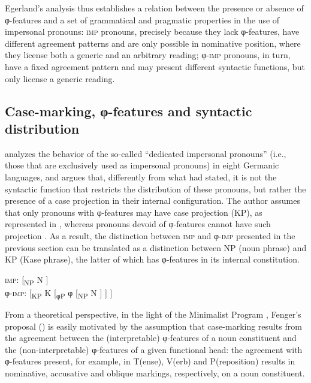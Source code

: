 \documentclass[output=paper]{langscibook}
\begin{document}
{Egerland’s analysis thus establishes a relation between the presence or absence of φ-fea\-tures and a set of grammatical and pragmatic properties in the use of impersonal pronouns: \textsc{imp} pronouns, precisely because they lack φ-fea\-tures, have different agreement patterns and are only possible in nominative position, where they license both a generic and an arbitrary reading; φ-\textsc{imp} pronouns, in turn, have a fixed agreement pattern and may present different syntactic functions, but only license a generic reading.}

\subsection{Case-marking, φ-fea\-tures and syntactic distribution}\label{sec:avelar:3.2}\largerpage[-1]

{\citet{Fenger2018} analyzes the behavior of the so-called “dedicated impersonal pronouns” (i.e., those that are exclusively used as impersonal pronouns) in eight Germanic languages, and argues that, differently from what \citet{Egerland2003} had stated, it is not the syntactic function that restricts the distribution of these pronouns, but rather the presence of a case projection in their internal configuration. The author assumes that only pronouns with φ-fea\-tures may have case projection (KP), as represented in , whereas pronouns devoid of φ-fea\-tures cannot have such projection . As a result, the distinction between \textsc{imp} and φ-\textsc{imp} presented in the previous section can be translated as a distinction between NP (noun phrase) and KP (Kase phrase), the latter of which has φ-fea\-tures in its internal constitution.}

\ea\label{ex:avelar:15}
  \ea\label{ex:avelar:15a} 
  \textsc{imp}: {[\textsubscript{NP}} {N ]}\\ 
  \ex\label{ex:avelar:15b} 
  φ-\textsc{imp}:    [{\textsubscript{KP}} {K [}{\textsubscript{φP}} {φ [}{\textsubscript{NP}} {N ] ] ]}\\
\z 
\z 

From a theoretical perspective, in the light of the Minimalist Program \citep{Chomsky1995}, Fenger’s proposal (\citeyear{Fenger2018}) is easily motivated by the assumption that case-marking results from the agreement between the (interpretable) φ-fea\-tures of a noun constituent and the (non-interpretable) φ-fea\-tures of a given functional head: the agreement with φ-fea\-tures present, for example, in T(ense), V(erb) and P(reposition) results in nominative, accusative and oblique markings, respectively, on a noun constituent.
\end{document}
